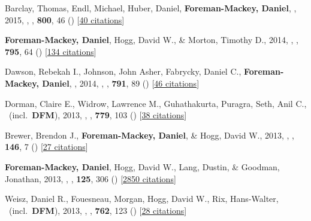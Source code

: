 \item[{\color{numcolor}\scriptsize7}] Barclay, Thomas, Endl, Michael, Huber, Daniel, \textbf{Foreman-Mackey, Daniel}, \etal, 2015, , \apj, \textbf{800}, 46 () [\href{http://adsabs.harvard.edu/abs/2015ApJ...800...46B}{40 citations}]

\item[{\color{numcolor}\scriptsize6}] \textbf{Foreman-Mackey, Daniel}, Hogg, David W., \& Morton, Timothy D., 2014, , \apj, \textbf{795}, 64 () [\href{http://adsabs.harvard.edu/abs/2014ApJ...795...64F}{134 citations}]

\item[{\color{numcolor}\scriptsize5}] Dawson, Rebekah I., Johnson, John Asher, Fabrycky, Daniel C., \textbf{Foreman-Mackey, Daniel}, \etal, 2014, , \apj, \textbf{791}, 89 () [\href{http://adsabs.harvard.edu/abs/2014ApJ...791...89D}{46 citations}]

\item[{\color{numcolor}\scriptsize4}] Dorman, Claire E., Widrow, Lawrence M., Guhathakurta, Puragra, Seth, Anil C., \etal\ (incl.\ \textbf{DFM}), 2013, , \apj, \textbf{779}, 103 () [\href{http://adsabs.harvard.edu/abs/2013ApJ...779..103D}{38 citations}]

\item[{\color{numcolor}\scriptsize3}] Brewer, Brendon J., \textbf{Foreman-Mackey, Daniel}, \& Hogg, David W., 2013, , \aj, \textbf{146}, 7 () [\href{http://adsabs.harvard.edu/abs/2013AJ....146....7B}{27 citations}]

\item[{\color{numcolor}\scriptsize2}] \textbf{Foreman-Mackey, Daniel}, Hogg, David W., Lang, Dustin, \& Goodman, Jonathan, 2013, , \pasp, \textbf{125}, 306 () [\href{http://adsabs.harvard.edu/abs/2013PASP..125..306F}{2850 citations}]

\item[{\color{numcolor}\scriptsize1}] Weisz, Daniel R., Fouesneau, Morgan, Hogg, David W., Rix, Hans-Walter, \etal\ (incl.\ \textbf{DFM}), 2013, , \apj, \textbf{762}, 123 () [\href{http://adsabs.harvard.edu/abs/2013ApJ...762..123W}{28 citations}]
